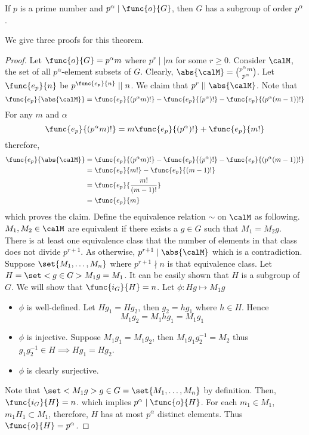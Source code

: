 \begin{theorem}[Sylow]
    If \(p\) is a prime number and \(p^{\alpha} \mid \func{o}{G}\), then \(G\) has a subgroup of order \(p^{\alpha}\).
\end{theorem}
We give three proofs for this theorem.
\begin{proof}
    Let \(\func{o}{G} = p^{\alpha}m\) where \(p^r \mid\mid m\) for some \(r \geq 0\). Consider \(\calM\), the set of all \(p^{\alpha}\)-element subsets of \(G\). Clearly, \(\abs{\calM} = \binom{p^{\alpha} m}{p^{\alpha}}\). Let \(\func{e_p}{n}\) be \(p^{\func{e_p}{n}} \mid\mid n\).
     We claim that \(p^r \mid \mid \abs{\calM}\). Note that 
    \begin{equation*}
        \func{e_p}{\abs{\calM}} =  \func{e_p}{(p^{\alpha}m)!} -  \func{e_p}{(p^{\alpha})!} -  \func{e_p}{(p^{\alpha}(m - 1))!}
    \end{equation*}
    For any \(m\) and \(\alpha\)
    \begin{equation*}
        \func{e_p}{(p^{\alpha}m)!} = m \func{e_p}{(p^{\alpha})!} + \func{e_p}{m!}
    \end{equation*}
    therefore,
    \begin{align*}
        \func{e_p}{\abs{\calM}} &=  \func{e_p}{(p^{\alpha}m)!} -  \func{e_p}{(p^{\alpha})!} -  \func{e_p}{(p^{\alpha}(m - 1))!}\\
        &= \func{e_p}{m!} - \func{e_p}{(m-1)!} \\
        &= \func{e_p}{\dfrac{m!}{(m-1)!}} \\
        &= \func{e_p}{m}
    \end{align*}
    which proves the claim. Define the equivalence relation \(\sim\) on \(\calM\) as following. \(M_1, M_2 \in \calM\) are equivalent if there exists a \(g \in G\) such that  \(M_1 = M_2 g\). There is at least one equivalence class that the number of elements in that class does not divide \(p^{r+1}\). As otherwise, \(p^{r+1}\mid \abs{\calM}\) which is a contradiction. Suppose \(\set{M_1, \dots, M_n}\) where \(p^{r+1} \nmid n\) is that equivalence class. Let \(H = \set<g \in G>{M_1 g = M_1}\). It can be easily shown that \(H\) is a subgroup of \(G\). We will show that \(\func{i_G}{H} = n\). Let \(\phi: Hg \mapsto M_1 g\)
    \begin{itemize}
        \item \(\phi\) is well-defined. Let \(Hg_1 = Hg_2\), then \(g_2 = hg_1\) where \(h \in H\). Hence 
        \begin{equation*}
            M_1 g_2 = M_1 hg_1 = M_1 g_1
        \end{equation*}
        \item \(\phi\) is injective. Suppose \(M_1 g_1 = M_1 g_2\), then \(M_1 g_1g^{-1}_2 = M_2\) thus \(g_1g_2^{-1} \in H \implies H g_1 = H g_2\).
        \item \(\phi\) is clearly surjective. 
    \end{itemize}
    Note that \(\set<M_1g>{g \in G} = \set{M_1, \dots, M_n}\) by definition. Then, \(\func{i_G}{H} = n\). which implies \(p^{\alpha} \mid \func{o}{H}\). For each \(m_1 \in M_1\), \(m_1 H_1 \subset M_1\), therefore, \(H\) has at most \(p^{\alpha}\) distinct elements. Thus \(\func{o}{H} = p^{\alpha}\).
\end{proof}


